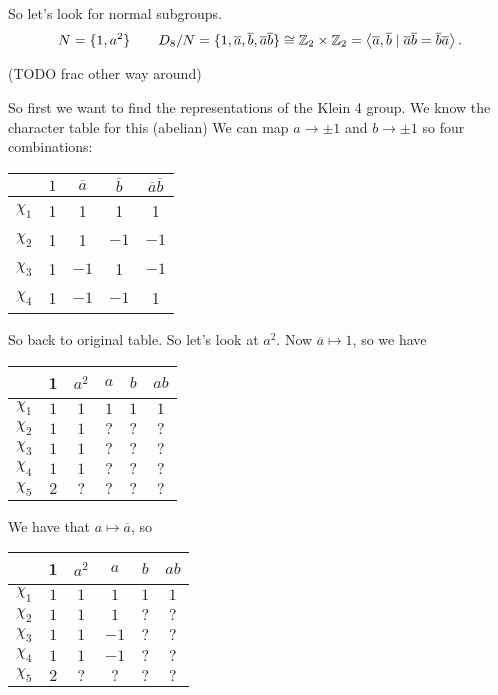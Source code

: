 So let's look for normal subgroups.
\[
N = \{1, a^2\}  \qquad  D_8 / N = \{1, \overline{a}, \overline{b}, \overline{a} \overline{b}\} \cong  \mathbb{Z}_2 \times \mathbb{Z}_2 = \left<\overline{a}, \overline{b}  \mid  \overline{a} \overline{b} = \overline{b} \overline{a}\right>
.\] 

(TODO frac other way around)

So first we want to find the representations of the Klein 4 group. We know the character table for this (abelian)
We can map $a \to  \pm 1$ and $b \to  \pm 1$ so four combinations:

\begin{center}\begin{tabular}{ccccc}\\
     & $1$ & $ \overline{a}$ & $\overline{b}$ & $\overline{a} \overline{b}$\\\hline
    $\chi_{1}$ & 1 & 1 & 1 & 1\\
    $\chi_{2}$ & 1 & 1 & $-1$ & $-1$\\
    $\chi_{3}$ & 1 & $-1$ & 1 & $-1$\\
    $\chi_{4}$ & 1 & $-1$ & $-1$ & 1\\
\end{tabular}\end{center}

So back to original table.
So let's look at $a^2$. Now $\overline{a} \mapsto  1$, so we have

\begin{center}\begin{tabular}{cccccc}
    & 1 & $a^2$ & $a$ &  $b$ &  $ab$\\ \hline
    $\chi_{1}$ & $1$ & $1$ & $1$ & $1$ & $1$  \\
    $\chi_{2}$ & $1$ & $1$ & $?$ & $?$ & $?$  \\
    $\chi_{3}$ & $1$ & $1$ & $?$ & $?$ & $?$  \\
    $\chi_{4}$ & $1$ & $1$ & $?$ & $?$ & $?$  \\
    $\chi_{5}$ & $2$ & $?$ & $?$ & $?$ & $?$ 
\end{tabular}\end{center}

We have that $a \mapsto  \overline{a}$, so 

\begin{center}\begin{tabular}{cccccc}
    & 1 & $a^2$ & $a$ &  $b$ &  $ab$\\ \hline
    $\chi_{1}$ & $1$ & $1$ & $1$ & $1$ & $1$  \\
    $\chi_{2}$ & $1$ & $1$ & $1$ & $?$ & $?$  \\
    $\chi_{3}$ & $1$ & $1$ & $-1$ & $?$ & $?$  \\
    $\chi_{4}$ & $1$ & $1$ & $-1$ & $?$ & $?$  \\
    $\chi_{5}$ & $2$ & $?$ & $?$ & $?$ & $?$ 
\end{tabular}\end{center}


